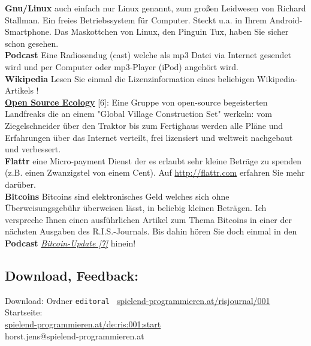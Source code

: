 \textbf{Gnu/Linux} auch einfach nur Linux genannt, zum großen Leidwesen von Richard Stallman. Ein freies Betriebssystem für Computer. Steckt u.a. in Ihrem Android-Smartphone. Das Maskottchen von Linux, den Pinguin Tux, haben Sie sicher schon gesehen. \\

\textbf{Podcast} Eine Radiosendug (cast) welche als mp3 Datei via Internet gesendet wird und per Computer oder mp3-Player (iPod) angehört wird. \\

\textbf{Wikipedia} Lesen Sie einmal die Lizenzinformation eines beliebigen Wikipedia-Artikels ! \\

\href{http://opensourceecology.org/}{\textbf{Open Source Ecology}} [6]: Eine Gruppe von open-source begeisterten  Landfreaks die an einem "Global Village Construction Set" werkeln: vom Ziegelschneider über den Traktor bis zum Fertighaus werden alle Pläne und Erfahrungen über das Internet verteilt, frei lizensiert und weltweit nachgebaut und verbessert.\\

\textbf{Flattr} eine Micro-payment Dienst der es erlaubt sehr kleine Beträge  zu spenden (z.B. einen Zwanzigstel von einem Cent). Auf \url{http://flattr.com} erfahren Sie mehr darüber.\\

\textbf{Bitcoins} Bitcoins sind elektronisches Geld welches sich ohne Überweisungsgebühr überweisen lässt, in beliebig kleinen Beträgen. Ich verspreche Ihnen einen ausführlichen Artikel zum Thema Bitcoins in einer der nächsten Ausgaben des R.I.S.-Journals. Bis dahin hören Sie doch einmal in den \textbf{Podcast}  \href{http://www.bitcoinupdate.com/}{\textit{Bitcoin-Update [7]}} hinein!

\subsection*{Download, Feedback:}
\footnotesize{
Download: Ordner \texttt{editoral} \Mundus\ \href{http://spielend-programmieren.at/risjournal/001}{spielend-programmieren.at/risjournal/001}\\
Startseite:\\
\href{http://spielend-programmieren.at/de:ris:001:start}{spielend-programmieren.at/de:ris:001:start}\\ 
\Letter\: horst.jens@spielend-programmieren.at}
\normalsize

